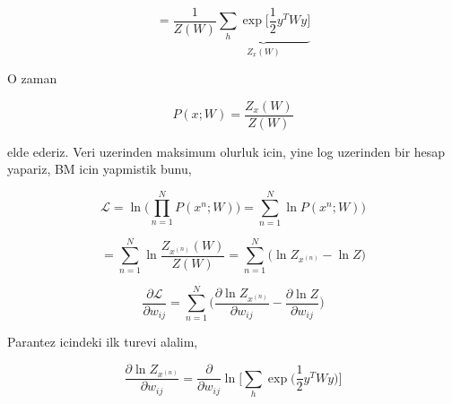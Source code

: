\documentclass[12pt,fleqn]{article}\usepackage{../common}
\begin{document}
$$  
= \frac{1}{Z(W)}  
\underbrace{
\sum_h \exp 
\bigg[ 
\frac{1}{2} y^T W y
\bigg]
}_{Z_x(W)}
$$

O zaman 

$$  
P(x;W) = \frac{Z_x(W)}{Z(W)} 
$$

elde ederiz. Veri uzerinden maksimum olurluk icin, yine log uzerinden bir
hesap yapariz, BM icin yapmistik bunu,

$$  
\mathcal{L} = 
\ln \big( \prod_{n=1}^{N} P(x^{n};W) \big) = 
\sum_{n=1}^{N} \ln P(x^{n};W) \big) 
$$

$$ 
= \sum_{n=1}^{N} \ln \frac{Z_{x^{(n)}}(W)}{Z(W)}  
= \sum_{n=1}^{N}  \big(\ln Z_{x^{(n)}} - \ln Z \big) 
$$


$$ 
\frac{\partial \mathcal{L} }{\partial w_{ij}} = 
 \sum_{n=1}^{N}  \big( \frac{\partial \ln Z_{x^{(n)}} }{\partial w_{ij}}
- \frac{\partial \ln Z }{\partial w_{ij}} \big)
$$

Parantez icindeki ilk turevi alalim,

$$ 
\frac{\partial \ln Z_{x^{(n)}} }{\partial w_{ij}} = 
\frac{\partial }{\partial w_{ij}}  \ln \bigg[ \sum_h \exp \big( \frac{1}{2} y^T W y \big) \bigg]
$$
\end{document}

